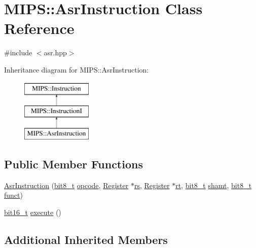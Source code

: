 \hypertarget{classMIPS_1_1AsrInstruction}{}\section{M\+I\+PS\+:\+:Asr\+Instruction Class Reference}
\label{classMIPS_1_1AsrInstruction}


{\ttfamily \#include $<$asr.\+hpp$>$}

Inheritance diagram for M\+I\+PS\+:\+:Asr\+Instruction\+:\begin{figure}[H]
\begin{center}
\leavevmode
\includegraphics[height=3.000000cm]{classMIPS_1_1AsrInstruction}
\end{center}
\end{figure}
\subsection*{Public Member Functions}
\begin{DoxyCompactItemize}
\item 
\hyperlink{classMIPS_1_1AsrInstruction_ae354d9deabc5e23bf244cb8907bb83cb}{Asr\+Instruction} (\hyperlink{core_8hpp_a6074bae122ae7b527864eec42c728c3c}{bit8\+\_\+t} \hyperlink{classMIPS_1_1Instruction_a45cc6808b5dde8a5d41067d148b55476}{opcode}, \hyperlink{classMIPS_1_1Register}{Register} $\ast$\hyperlink{classMIPS_1_1InstructionI_a2be191d5b3dce505e2e626ec02eb4d62}{rs}, \hyperlink{classMIPS_1_1Register}{Register} $\ast$\hyperlink{classMIPS_1_1InstructionI_add1db07a5c954f35271de8c8a5737487}{rt}, \hyperlink{core_8hpp_a6074bae122ae7b527864eec42c728c3c}{bit8\+\_\+t} \hyperlink{classMIPS_1_1InstructionI_aa9b6da37c374c2ec8d96448d341e5e7d}{shamt}, \hyperlink{core_8hpp_a6074bae122ae7b527864eec42c728c3c}{bit8\+\_\+t} \hyperlink{classMIPS_1_1InstructionI_a5c6efcbbd233a7447c1fe24ea0a1e558}{funct})
\item 
\hyperlink{core_8hpp_adc265a970bc35995b5879784bbb3f1b7}{bit16\+\_\+t} \hyperlink{classMIPS_1_1AsrInstruction_aad46283e10517abf6bf5e527ca020d53}{execute} ()
\end{DoxyCompactItemize}
\subsection*{Additional Inherited Members}


